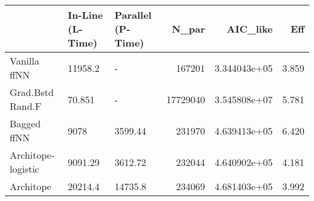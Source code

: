 \begin{tabular}{lllrrr}
\toprule
{} & In-Line (L-Time) & Parallel (P-Time) &     N\_par &      AIC\_like &    Eff \\
\midrule
Vanilla ffNN       &          11958.2 &                 - &    167201 &  3.344043e+05 &  3.859 \\
Grad.Bstd Rand.F   &           70.851 &                 - &  17729040 &  3.545808e+07 &  5.781 \\
Bagged ffNN        &             9078 &           3599.44 &    231970 &  4.639413e+05 &  6.420 \\
Architope-logistic &          9091.29 &           3612.72 &    232044 &  4.640902e+05 &  4.181 \\
Architope          &          20214.4 &           14735.8 &    234069 &  4.681403e+05 &  3.992 \\
\bottomrule
\end{tabular}
